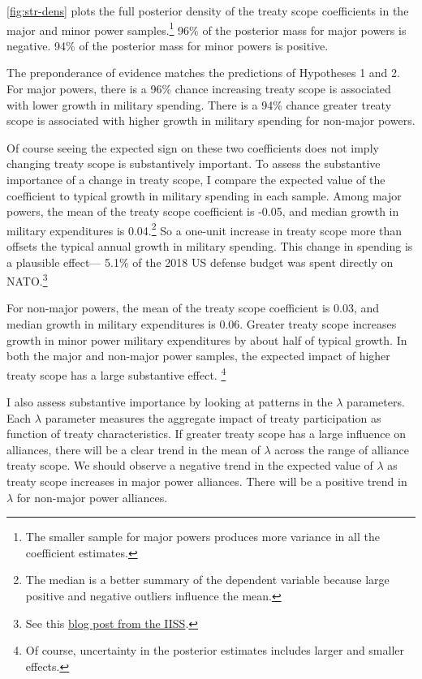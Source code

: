 \documentclass[12pt]{article}
\begin{document}
\autoref{fig:str-dens} plots the full posterior density of the treaty scope coefficients in the major and minor power samples.\footnote{The smaller sample for major powers produces more variance in all the coefficient estimates.} 
96\% of the posterior mass for major powers is negative. 
94\% of the posterior mass for minor powers is positive. 


The preponderance of evidence matches the predictions of Hypotheses 1 and 2. 
For major powers, there is a 96\% chance increasing treaty scope is associated with lower growth in military spending. 
There is a 94\% chance greater treaty scope is associated with higher growth in military spending for non-major powers.


Of course seeing the expected sign on these two coefficients does not imply changing treaty scope is substantively important. 
To assess the substantive importance of a change in treaty scope, I compare the expected value of the coefficient to typical growth in military spending in each sample. 
Among major powers, the mean of the treaty scope coefficient is -0.05, and median growth in military expenditures is 0.04.\footnote{The median is a better summary of the dependent variable because large positive and negative outliers influence the mean.} 
So a one-unit increase in treaty scope more than offsets the typical annual growth in military spending. 
This change in spending is a plausible effect--- 5.1\% of the 2018 US defense budget was spent directly on NATO.\footnote{See this \href{https://www.iiss.org/blogs/military-balance/2018/07/us-and-nato-allies-costs-and-value}{blog post from the IISS}.} 


For non-major powers, the mean of the treaty scope coefficient is 0.03, and median growth in military expenditures is 0.06. 
Greater treaty scope increases growth in minor power military expenditures by about half of typical growth. 
In both the major and non-major power samples, the expected impact of higher treaty scope has a large substantive effect. \footnote{Of course, uncertainty in the posterior estimates includes larger and smaller effects.}


I also assess substantive importance by looking at patterns in the $\lambda$ parameters. 
Each $\lambda$ parameter measures the aggregate impact of treaty participation as function of treaty characteristics. 
If greater treaty scope has a large influence on alliances, there will be a clear trend in the mean of $\lambda$ across the range of alliance treaty scope.
We should observe a negative trend in the expected value of $\lambda$ as treaty scope increases in major power alliances. 
There will be a positive trend in $\lambda$ for non-major power alliances. 
\end{document}
